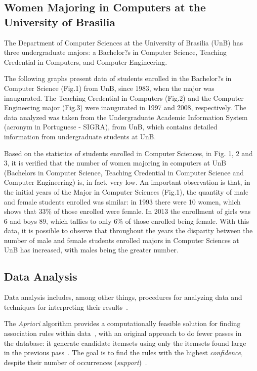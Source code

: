 \subsection{Women Majoring in Computers at the University of Brasilia}

The Department of Computer Sciences at the University of Brasilia (UnB) has three undergraduate majors: a Bachelor?s in Computer Science, Teaching Credential in Computers, and Computer Engineering.

The following graphs present data of students enrolled in the Bachelor?s in Computer Science (Fig.1) from UnB, since 1983, when the major was inaugurated. The Teaching Credential in Computers (Fig.2) and the Computer Engineering major (Fig.3) were inaugurated in 1997 and 2008, respectively. The data analyzed was taken from the Undergraduate Academic Information System (acronym in Portuguese - SIGRA), from UnB, which contains detailed information from undergraduate students at UnB.

Based on the statistics of students enrolled in Computer Sciences, in Fig. 1, 2 and 3, it is verified that the number of women majoring in computers at UnB (Bachelors in Computer Science, Teaching Credential in Computer Science and Computer Engineering) is, in fact, very low. An important observation  is that, in the initial years of the Major in Computer Sciences (Fig.1), the quantity of male and female students enrolled was similar: in 1993 there were 10 women, which shows that 33\% of those enrolled were female. In 2013 the enrollment of girls was 6 and boys 89, which tallies to only 6\% of those enrolled being female. With this data, it is possible to observe that throughout the years the disparity between the number of male and female students enrolled majors in Computer Sciences at UnB has increased, with males being the greater number.



\subsection{Data Analysis}\label{subsec:background:data}%

Data analysis includes, among other things, procedures for analyzing data and techniques for interpreting their results~\cite{Tukey1962}.

The \emph{Apriori} algorithm provides a computationally feasible solution for finding association rules within data~\cite{Hastie2009}, with an original approach to do fewer passes in the database: it generate candidate itemsets using only the itemsets found large in the previous pass~\cite{Agrawal1994}. The goal is to find the rules with the highest \emph{confidence}, despite their number of occurrences (\emph{support})~\cite{taniar_exception_2008}.

